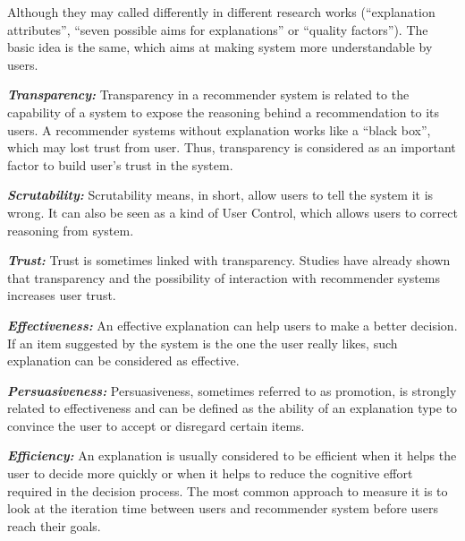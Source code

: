         \indent Although they may called differently in different research works
        (``explanation attributes''\cite{al2013explanations}, ``seven possible aims for explanations''\cite{tintarev2012evaluating}
        or ``quality factors''\cite{gedikli2014should}).
        The basic idea is the same, which aims at making system more understandable by users.
        
        \indent \textbf{\textit{Transparency:}} Transparency in a recommender system is related to
         the capability of a system to expose the reasoning behind a recommendation to its users\cite{herlocker2000explaining}.
         A recommender systems without explanation works like a ``black box'', which may lost trust from user. 
         Thus, transparency is considered as an important factor to build user's trust in the system\cite{swearingen2002interaction}.

        \indent \textbf{\textit{Scrutability:}} Scrutability means, in short, allow users to tell the system it is wrong.
        It can also be seen as a kind of User Control, which allows users to correct reasoning from system\cite{czarkowski2002scrutable}.
        
        \indent \textbf{\textit{Trust:}} Trust is sometimes linked with transparency.
        Studies have already shown that transparency and 
        the possibility of interaction with recommender systems increases user trust\cite{felfernig2007knowledge}\cite{sinha2002role}.
        
        \indent \textbf{\textit{Effectiveness:}} An effective explanation can help users to make a better decision.
        If an item suggested by the system is the one the user really likes, such explanation can be considered as effective.

        \indent \textbf{\textit{Persuasiveness:}} Persuasiveness, sometimes referred to as promotion, 
        is strongly related to effectiveness and 
        can be defined as the ability of an explanation type to convince the user to accept or disregard certain items\cite{gedikli2014should}.

        \indent \textbf{\textit{Efficiency:}} An explanation is usually considered to be efficient when
         it helps the user to decide more quickly or when it helps to reduce the cognitive effort required in the decision process\cite{gedikli2014should}.
         The most common approach to measure it is to look at the iteration time between users and recommender system before users reach their goals.

